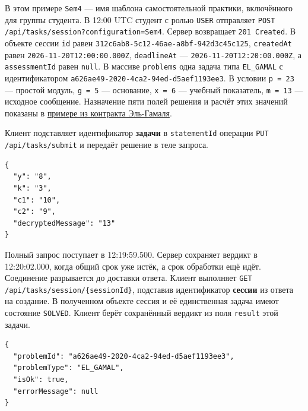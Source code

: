 \documentclass[12pt,a4paper]{article}
\begin{document}
В этом примере \texttt{Sem4} --- имя шаблона самостоятельной практики, включённого для группы студента. В 12:00 UTC студент с ролью \texttt{USER} отправляет \texttt{POST /\allowbreak{}api/\allowbreak{}tasks/\allowbreak{}session?\allowbreak{}configuration=\allowbreak{}Sem4}. Сервер возвращает \texttt{201\ Created}. В объекте сессии \texttt{id} равен \texttt{312c6ab8-\allowbreak{}5c12-\allowbreak{}46ae-\allowbreak{}a8bf-\allowbreak{}942d3c45c125}, \texttt{createdAt} равен \texttt{2026-\allowbreak{}11-\allowbreak{}20T12:00:00.\allowbreak{}000Z}, \texttt{deadlineAt} --- \texttt{2026-\allowbreak{}11-\allowbreak{}20T12:20:00.\allowbreak{}000Z}, а \texttt{assessment\allowbreak{}Id} равен \texttt{null}. В массиве \texttt{problems} одна задача типа \texttt{EL\_GAMAL} с идентификатором \texttt{a626ae49-\allowbreak{}2020-\allowbreak{}4ca2-\allowbreak{}94ed-\allowbreak{}d5aef1193ee3}. В условии \texttt{p\ =\ 23} --- простой модуль, \texttt{g\ =\ 5} --- основание, \texttt{x\ =\ 6} --- учебный показатель, \texttt{m\ =\ 13} --- исходное сообщение. Назначение пяти полей решения и расчёт этих значений показаны в {\href{../07\_Программные\_требования/DOC-06.2\_Сессии\_задач\_и\_планировщик.pdf\#учебный-пример-решения-эль-гамаля}{примере из контракта Эль-Гамаля}}.

Клиент подставляет идентификатор \textbf{задачи} в \texttt{statement\allowbreak{}Id} операции \texttt{PUT /\allowbreak{}api/\allowbreak{}tasks/\allowbreak{}submit} и передаёт решение в теле запроса.

\begin{verbatim}
{
  "y": "8",
  "k": "3",
  "c1": "10",
  "c2": "9",
  "decryptedMessage": "13"
}
\end{verbatim}

Полный запрос поступает в 12:19:59.500. Сервер сохраняет вердикт в 12:20:02.000, когда общий срок уже истёк, а срок обработки ещё идёт. Соединение разрывается до доставки ответа. Клиент выполняет \texttt{GET /\allowbreak{}api/\allowbreak{}tasks/\allowbreak{}session/\allowbreak{}\{session\allowbreak{}Id\}}, подставив идентификатор \textbf{сессии} из ответа на создание. В полученном объекте сессия и её единственная задача имеют состояние \texttt{SOLVED}. Клиент берёт сохранённый вердикт из поля \texttt{result} этой задачи.

\begin{verbatim}
{
  "problemId": "a626ae49-2020-4ca2-94ed-d5aef1193ee3",
  "problemType": "EL_GAMAL",
  "isOk": true,
  "errorMessage": null
}
\end{verbatim}
\end{document}
